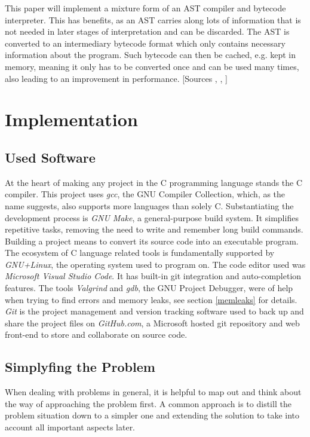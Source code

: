 \documentclass[12pt,a4paper]{article}
\begin{document}
This paper will implement a mixture form of an AST compiler and bytecode
interpreter. This has benefits, as an AST carries along lots of information
that is not needed in later stages of interpretation and can be discarded.
The AST is converted to an intermediary bytecode format which only contains
necessary information about the program. Such bytecode can then be cached,
e.g. kept in memory, meaning it only has to be converted once and can be
used many times, also leading to an improvement in performance.
[Sources , , ]

\section{Implementation}
\subsection{Used Software}
At the heart of making any project in the C programming language
stands the C compiler. This project uses
\emph{gcc}, the GNU Compiler Collection, which, as the name suggests, also 
supports more languages than solely C. Substantiating the development process is 
\emph{GNU Make}, a general-purpose build system. It simplifies repetitive tasks,
removing the need to write and remember long build commands. Building a project
means to convert its source code into an executable program.
The ecosystem of C language related tools is fundamentally supported by 
\emph{GNU+Linux}, the operating system used to program on.
The code editor used was \emph{Microsoft Visual Studio Code}.
It has built-in git integration and auto-completion features.
The tools \emph{Valgrind} and \emph{gdb}, the GNU Project Debugger, were of help
when trying to find errors and memory leaks, see section \ref{memleaks} for details.
\emph{Git} is the project management and version tracking software used to back up and share
the project files on \emph{GitHub.com}, a Microsoft hosted git repository and
web front-end to store and collaborate on source code.

\subsection{Simplyfing the Problem}
When dealing with problems in general, it is helpful to map out and think about
the way of approaching the problem first. A common approach is to distill the
problem situation down to a simpler one and extending the solution to take into
account all important aspects later.
\end{document}
